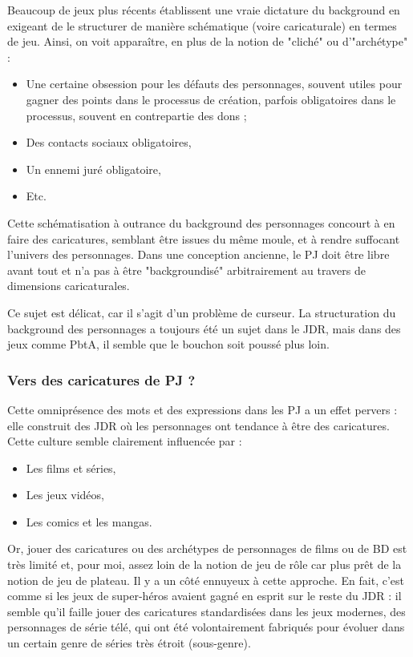 \documentclass[a4paper, 11pt, twoside]{article}
\begin{document}
Beaucoup de jeux plus récents établissent une vraie dictature du background en exigeant de le structurer de manière schématique (voire caricaturale) en termes de jeu. Ainsi, on voit apparaître, en plus de la notion de "cliché" ou d'"archétype"  :
\begin{itemize}
\item Une certaine obsession pour les défauts des personnages, souvent utiles pour gagner des points dans le processus de création, parfois obligatoires dans le processus, souvent en contrepartie des dons ;
\item Des contacts sociaux obligatoires,
\item Un ennemi juré obligatoire,
\item Etc.
\end{itemize}

Cette schématisation à outrance du background des personnages concourt à en faire des caricatures, semblant être issues du même moule, et à rendre suffocant l'univers des personnages. Dans une conception ancienne, le PJ doit être libre avant tout et n'a pas à être "backgroundisé" arbitrairement au travers de dimensions caricaturales.

Ce sujet est délicat, car il s'agit d'un problème de curseur. La structuration du background des personnages a toujours été un sujet dans le JDR, mais dans des jeux comme PbtA, il semble que le bouchon soit poussé plus loin.

\subsubsection{Vers des caricatures de PJ ?}
\label{sec:org9852821}

Cette omniprésence des mots et des expressions dans les PJ a un effet pervers : elle construit des JDR où les personnages ont tendance à être des caricatures. Cette culture semble clairement influencée par :
\begin{itemize}
\item Les films et séries,
\item Les jeux vidéos,
\item Les comics et les mangas.
\end{itemize}

Or, jouer des caricatures ou des archétypes de personnages de films ou de BD est très limité et, pour moi, assez loin de la notion de jeu de rôle car plus prêt de la notion de jeu de plateau. Il y a un côté ennuyeux à cette approche. En fait, c'est comme si les jeux de super-héros avaient gagné en esprit sur le reste du JDR : il semble qu'il faille jouer des caricatures standardisées dans les jeux modernes, des personnages de série télé, qui ont été volontairement fabriqués pour évoluer dans un certain genre de séries très étroit (sous-genre).
\end{document}
